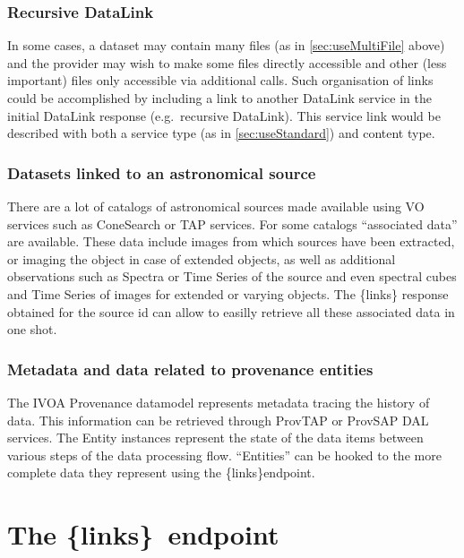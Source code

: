 \documentclass[11pt,a4paper]{ivoa}
\newcommand{\blinks}{\{links\}}
\begin{document}
\subsubsection{Recursive DataLink}

In some cases, a dataset may contain many files
(as in \ref{sec:useMultiFile} above)
and the provider may wish to make some files directly accessible and
other (less important) files only accessible via additional calls. Such
organisation of links could be accomplished by including a link to
another DataLink service in the initial DataLink response (e.g.\ recursive
DataLink). This service link would be described with both a service type
(as in \ref{sec:useStandard}) and content type.


\subsubsection{Datasets linked to an astronomical source}

There are  a lot of catalogs of astronomical sources made available
using VO services such as ConeSearch \citep{2008ivoa.specQ0222P} or TAP
services. For some catalogs ``associated data'' are available. These
data include images from which sources have been extracted, or imaging the
object in  case of extended objects, as well as additional observations
such as Spectra or Time Series of the source and even spectral cubes
and Time Series of images for extended or varying objects. The \blinks
response obtained for the source id can allow to easilly retrieve all
these associated data in one shot.

\subsubsection{Metadata and data related to provenance entities}



The IVOA Provenance datamodel \citep{pr:provdm} represents metadata
tracing  the history of data. This information can be retrieved through
ProvTAP \citep{iwd:provtap} or ProvSAP \citep{iwd:provsap}  DAL services.
The Entity instances represent  the state of the data items between
various steps of the data processing flow. ``Entities'' can be hooked
to the more complete data they represent using the \blinks endpoint.

\section{The \blinks~endpoint}
\end{document}
